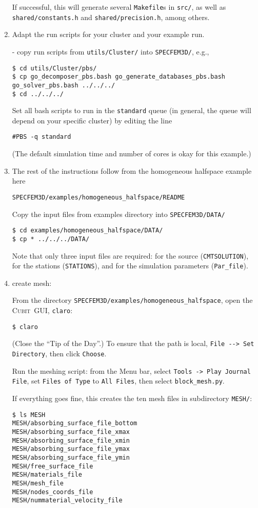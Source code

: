 \documentclass[10pt,fleqn,letterpaper]{article}
\newcommand{\cubit}{\textsc{Cubit}}
\begin{document}
\begin{enumerate}
If successful, this will generate several \verb+Makefile+s in \verb+src/+, as well as \verb+shared/constants.h+ and \verb+shared/precision.h+, among others.

\item Adapt the run scripts for your cluster and your example run.

- copy run scripts from \verb+utils/Cluster/+ into \verb+SPECFEM3D/+, e.g.,
\begin{lstlisting}
$ cd utils/Cluster/pbs/
$ cp go_decomposer_pbs.bash go_generate_databases_pbs.bash go_solver_pbs.bash ../../../
$ cd ../../../
\end{lstlisting}

Set all bash scripts to run in the \verb+standard+ queue (in general, the queue will depend on your specific cluster) by editing the line
\begin{lstlisting}
#PBS -q standard
\end{lstlisting}
(The default simulation time and number of cores is okay for this example.)
 
\item The rest of the instructions follow from the homogeneous halfspace example here
\begin{lstlisting}
SPECFEM3D/examples/homogeneous_halfspace/README
\end{lstlisting}

Copy the input files from examples directory into \verb+SPECFEM3D/DATA/+
\begin{lstlisting}
$ cd examples/homogeneous_halfspace/DATA/
$ cp * ../../../DATA/
\end{lstlisting}
%
Note that only three input files are required: for the source (\verb+CMTSOLUTION+), for the stations (\verb+STATIONS+), and for the simulation parameters (\verb+Par_file+).

\item create mesh:

From the directory \verb+SPECFEM3D/examples/homogeneous_halfspace+, open the \cubit\ GUI, \verb+claro+:
\begin{lstlisting}
$ claro
\end{lstlisting}
%
(Close the ``Tip of the Day''.)
To ensure that the path is local, \verb+File --> Set Directory+, then click \verb+Choose+.

Run the meshing script: from the Menu bar, select \verb+Tools -> Play Journal File+, set \verb+Files of Type+ to \verb+All Files+, then select \verb+block_mesh.py+.

If everything goes fine, this creates the ten mesh files in subdirectory \verb+MESH/+:
\begin{lstlisting}
$ ls MESH
MESH/absorbing_surface_file_bottom
MESH/absorbing_surface_file_xmax
MESH/absorbing_surface_file_xmin
MESH/absorbing_surface_file_ymax
MESH/absorbing_surface_file_ymin
MESH/free_surface_file
MESH/materials_file
MESH/mesh_file
MESH/nodes_coords_file
MESH/nummaterial_velocity_file
\end{lstlisting}


\end{enumerate}
\end{document}
